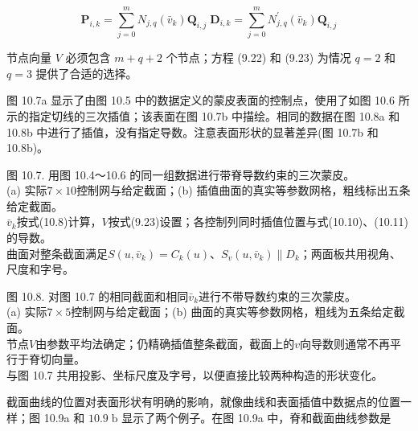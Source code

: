 \documentclass[../main.tex]{subfiles}
\begin{document}
\[
{\mathbf{P}}_{i,k} = \mathop{\sum }\limits_{{j = 0}}^{m}{N}_{j,q}\left( {\bar{v}}_{k}\right) {\mathbf{Q}}_{i,j}\;{\mathbf{D}}_{i,k} = \mathop{\sum }\limits_{{j = 0}}^{m}{N}_{j,q}^{\prime }\left( {\bar{v}}_{k}\right) {\mathbf{Q}}_{i,j} \tag{10.13}
\]

节点向量 \(V\) 必须包含 \(m + q + 2\) 个节点；方程 (9.22) 和 (9.23) 为情况 \(q = 2\) 和 \(q = 3\) 提供了合适的选择。

图 10.7a 显示了由图 10.5 中的数据定义的蒙皮表面的控制点，使用了如图 10.6 所示的指定切线的三次插值；该表面在图 10.7b 中描绘。相同的数据在图 10.8a 和 10.8b 中进行了插值，没有指定导数。注意表面形状的显著差异(图 10.7b 和 10.8b)。

\begin{center}
\begin{minipage}{34cm}
\vspace*{.6\baselineskip}
\centering
{}
\par\smallskip
图 10.7. 用图 10.4～10.6 的同一组数据进行带脊导数约束的三次蒙皮。\\
(a) 实际$7\times10$控制网与给定截面；(b) 插值曲面的真实等参数网格，粗线标出五条给定截面。\\
$\bar v_k$按式(10.8)计算，$V$按式(9.23)设置；各控制列同时插值位置与式(10.10)、(10.11)的导数。\\
曲面对整条截面满足$S(u,\bar v_k)=C_k(u)$、$S_v(u,\bar v_k)\parallel D_k$；两面板共用视角、尺度和字号。
\end{minipage}
\end{center}

\begin{center}
\begin{minipage}{34cm}
\vspace*{.6\baselineskip}
\centering
{}
\par\smallskip
图 10.8. 对图 10.7 的相同截面和相同$\bar v_k$进行不带导数约束的三次蒙皮。\\
(a) 实际$7\times5$控制网与给定截面；(b) 曲面的真实等参数网格，粗线为五条给定截面。\\
节点$V$由参数平均法确定；仍精确插值整条截面，截面上的$v$向导数则通常不再平行于脊切向量。\\
与图 10.7 共用投影、坐标尺度及字号，以便直接比较两种构造的形状变化。
\end{minipage}
\end{center}

截面曲线的位置对表面形状有明确的影响，就像曲线和表面插值中数据点的位置一样；图 10.9a 和 \({10.9}\mathrm{\;b}\) 显示了两个例子。在图 10.9a 中，脊和截面曲线参数是
\end{document}
